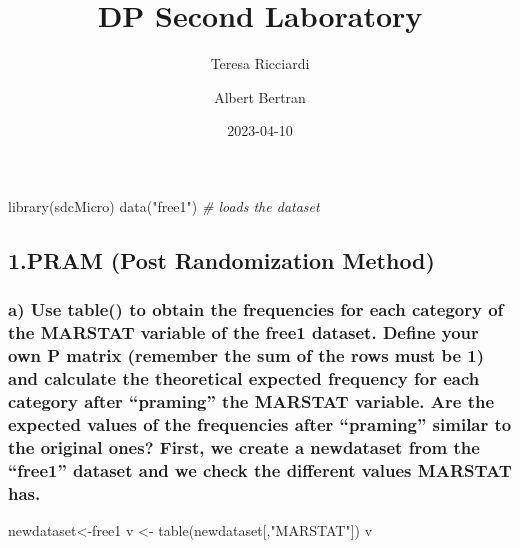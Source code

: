 \documentclass[
]{article}
\title{DP Second Laboratory}
\author{Teresa Ricciardi \and Albert Bertran}
\date{2023-04-10}
\newenvironment{Shaded}{\begin{snugshade}}{\end{snugshade}}
\newcommand{\CommentTok}[1]{\textcolor[rgb]{0.56,0.35,0.01}{\textit{#1}}}
\newcommand{\FunctionTok}[1]{\textcolor[rgb]{0.00,0.00,0.00}{#1}}
\newcommand{\NormalTok}[1]{#1}
\newcommand{\OtherTok}[1]{\textcolor[rgb]{0.56,0.35,0.01}{#1}}
\newcommand{\StringTok}[1]{\textcolor[rgb]{0.31,0.60,0.02}{#1}}
\begin{document}
\maketitle

\begin{Shaded}
\begin{Highlighting}[]
\FunctionTok{library}\NormalTok{(sdcMicro)}
\FunctionTok{data}\NormalTok{(}\StringTok{"free1"}\NormalTok{) }\CommentTok{\# loads the dataset}
\end{Highlighting}
\end{Shaded}

\hypertarget{pram-post-randomization-method}{%
\subsection{1.PRAM (Post Randomization
Method)}\label{pram-post-randomization-method}}

\hypertarget{a-use-table-to-obtain-the-frequencies-for-each-category-of-the-marstat-variable-of-the-free1-dataset.-define-your-own-p-matrix-remember-the-sum-of-the-rows-must-be-1-and-calculate-the-theoretical-expected-frequency-for-each-category-after-praming-the-marstat-variable.-are-the-expected-values-of-the-frequencies-after-praming-similar-to-the-original-ones-first-we-create-a-newdataset-from-the-free1-dataset-and-we-check-the-different-values-marstat-has.}{%
\subsubsection{a) Use table() to obtain the frequencies for each
category of the MARSTAT variable of the free1 dataset. Define your own P
matrix (remember the sum of the rows must be 1) and calculate the
theoretical expected frequency for each category after ``praming'' the
MARSTAT variable. Are the expected values of the frequencies after
``praming'' similar to the original ones? First, we create a newdataset
from the ``free1'' dataset and we check the different values MARSTAT
has.}\label{a-use-table-to-obtain-the-frequencies-for-each-category-of-the-marstat-variable-of-the-free1-dataset.-define-your-own-p-matrix-remember-the-sum-of-the-rows-must-be-1-and-calculate-the-theoretical-expected-frequency-for-each-category-after-praming-the-marstat-variable.-are-the-expected-values-of-the-frequencies-after-praming-similar-to-the-original-ones-first-we-create-a-newdataset-from-the-free1-dataset-and-we-check-the-different-values-marstat-has.}}

\begin{Shaded}
\begin{Highlighting}[]
\NormalTok{newdataset}\OtherTok{\textless{}{-}}\NormalTok{free1}
\NormalTok{v }\OtherTok{\textless{}{-}} \FunctionTok{table}\NormalTok{(newdataset[,}\StringTok{"MARSTAT"}\NormalTok{])}
\NormalTok{v}
\end{Highlighting}
\end{Shaded}
\end{document}
